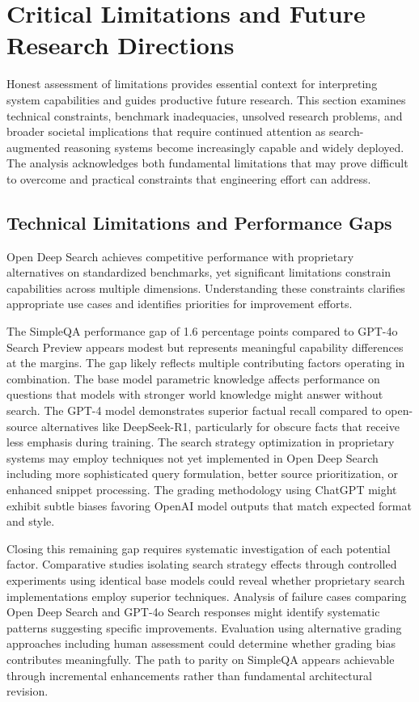\section{Critical Limitations and Future Research Directions}

Honest assessment of limitations provides essential context for interpreting system capabilities and guides productive future research. This section examines technical constraints, benchmark inadequacies, unsolved research problems, and broader societal implications that require continued attention as search-augmented reasoning systems become increasingly capable and widely deployed. The analysis acknowledges both fundamental limitations that may prove difficult to overcome and practical constraints that engineering effort can address.

\subsection{Technical Limitations and Performance Gaps}

Open Deep Search achieves competitive performance with proprietary alternatives on standardized benchmarks, yet significant limitations constrain capabilities across multiple dimensions. Understanding these constraints clarifies appropriate use cases and identifies priorities for improvement efforts.

The SimpleQA performance gap of 1.6 percentage points compared to GPT-4o Search Preview appears modest but represents meaningful capability differences at the margins. The gap likely reflects multiple contributing factors operating in combination. The base model parametric knowledge affects performance on questions that models with stronger world knowledge might answer without search. The GPT-4 model demonstrates superior factual recall compared to open-source alternatives like DeepSeek-R1, particularly for obscure facts that receive less emphasis during training. The search strategy optimization in proprietary systems may employ techniques not yet implemented in Open Deep Search including more sophisticated query formulation, better source prioritization, or enhanced snippet processing. The grading methodology using ChatGPT might exhibit subtle biases favoring OpenAI model outputs that match expected format and style.

Closing this remaining gap requires systematic investigation of each potential factor. Comparative studies isolating search strategy effects through controlled experiments using identical base models could reveal whether proprietary search implementations employ superior techniques. Analysis of failure cases comparing Open Deep Search and GPT-4o Search responses might identify systematic patterns suggesting specific improvements. Evaluation using alternative grading approaches including human assessment could determine whether grading bias contributes meaningfully. The path to parity on SimpleQA appears achievable through incremental enhancements rather than fundamental architectural revision.

